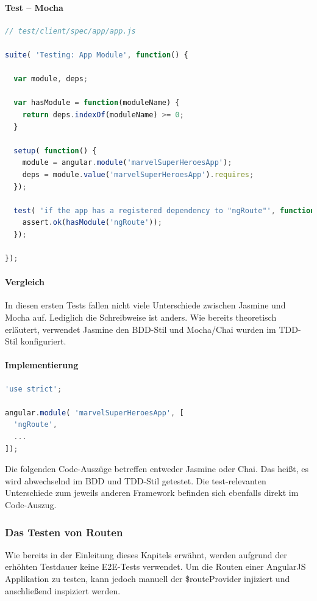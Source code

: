 \paragraph{Test -- Mocha}
\begin{lstlisting}[language=JavaScript, caption=TDD AngularJS - Dependencies - Mocha]
// test/client/spec/app/app.js

suite( 'Testing: App Module', function() {

  var module, deps;

  var hasModule = function(moduleName) {
    return deps.indexOf(moduleName) >= 0;
  }

  setup( function() {
    module = angular.module('marvelSuperHeroesApp');
    deps = module.value('marvelSuperHeroesApp').requires;
  });

  test( 'if the app has a registered dependency to "ngRoute"', function() {
    assert.ok(hasModule('ngRoute'));
  });

});
\end{lstlisting}

\paragraph{Vergleich}
In diesen ersten Tests fallen nicht viele Unterschiede zwischen Jasmine und Mocha auf. Lediglich die Schreibweise ist anders. Wie bereits theoretisch erläutert, verwendet Jasmine den BDD-Stil und Mocha/Chai wurden im TDD-Stil konfiguriert.

\paragraph{Implementierung}
\begin{lstlisting}[language=JavaScript, caption=TDD AngularJS - Dependencies - Implementierung]
'use strict';

angular.module( 'marvelSuperHeroesApp', [
  'ngRoute',
  ...
]);
\end{lstlisting}

Die folgenden Code-Auszüge betreffen entweder Jasmine oder Chai. Das heißt, es wird abwechselnd im BDD und TDD-Stil getestet. Die test-relevanten Unterschiede zum jeweils anderen Framework befinden sich ebenfalls direkt im Code-Auszug.

\newpage
\subsubsection{Das Testen von Routen}
Wie bereits in der Einleitung dieses Kapitels erwähnt, werden aufgrund der erhöhten Testdauer keine E2E-Tests verwendet. Um die Routen einer AngularJS Applikation zu testen, kann jedoch manuell der \$routeProvider injiziert und anschließend inspiziert werden.

